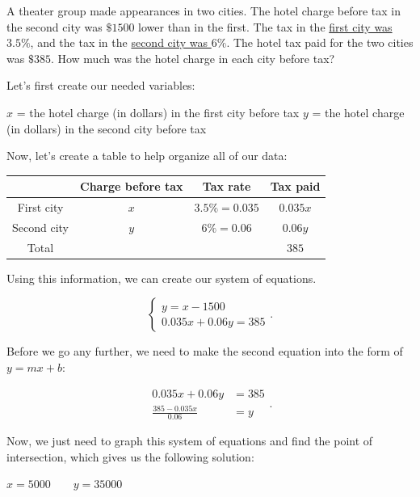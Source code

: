 \label{les_4_unit_2:solve_tax_rate/interest_using_system_of_equations}

A theater group made appearances in two cities. The hotel charge before tax in
the second city was $\$1500$ lower than in the first. The tax in the
\underline{first city was $3.5\%$}, and the tax in the \underline{second city
was $6\%$}. The hotel tax paid for the two cities was $\$385$. How much was the
hotel charge in each city before tax?

Let's first create our needed variables:

$x$ = the hotel charge (in dollars) in the first city before tax
$y$ = the hotel charge (in dollars) in the second city before tax

Now, let's create a table to help organize all of our data:

\begin{tabular}{|c|c|c|c|}
  \hline
  & Charge before tax & Tax rate & Tax paid \\
  \hline
  First city & $x$ & $3.5\% = 0.035$ & $0.035x$ \\
  \hline
  Second city & $y$ & $6\% = 0.06$ & $0.06y$ \\
  \hline
  Total & & & $385$ \\
  \hline
\end{tabular}

Using this information, we can create our system of equations. 

\begin{equation}
  \label{cse:final_system_of_equations}
  \begin{cases}
    y = x - 1500 \\
    0.035x + 0.06y = 385
  \end{cases}
.\end{equation}

Before we go any further, we need to make the second equation into the form of
$y = mx + b$:

\begin{equation}
  \label{spt:transform_equation_into_y_mx_b}
  \begin{split}
    0.035x + 0.06y &= 385 \\
    \frac{385 - 0.035x}{0.06} &= y
  \end{split}
.\end{equation}

Now, we just need to graph this system of equations and find the point of
intersection, which gives us the following solution:

$x = 5000 \qquad y=35000$

\newpage
